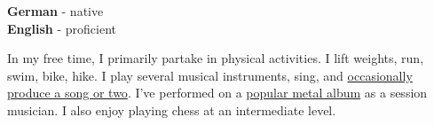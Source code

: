 \documentclass[9pt]{developercv} %
\begin{document}

\begin{minipage}[t]{0.3\textwidth}
	\vspace{-\baselineskip} %

	
	\textbf{German} - native\\
	\textbf{English} - proficient\\
\end{minipage}
\hfill
\begin{minipage}[t]{0.5\textwidth}
	\vspace{-\baselineskip} %
	
	
	In my free time, I primarily partake in physical activities. I lift weights, run, swim, bike, hike. I play several musical instruments, sing, and \textcolor{blue}{\href{https://open.spotify.com/artist/2M3v41tQLJG1nek13NGrow?si=o6iBdOBNQvqiQ5qq6Wze6A}{occasionally produce a song or two}}. I've performed on a \textcolor{blue}{\href{https://en.wikipedia.org/wiki/No_Grave_But_the_Sea}{popular metal album}} as a session musician.
    I also enjoy playing chess at an intermediate level.
\end{minipage}
\hfill

\end{document}
